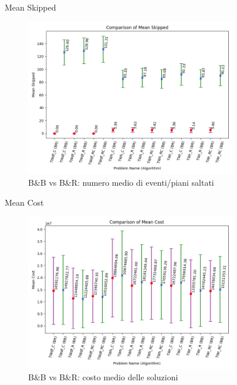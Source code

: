 \documentclass[10pt]{beamer}
\begin{document}
    \begin{frame}{Mean Skipped}
        \begin{figure}[h!]
            \centering
            \includegraphics[width=0.82\textwidth]{Images/mean_skipped.png}
            \caption{B\&B vs B\&R: numero medio di eventi/piani saltati}
            \label{fig:mean_skipped}
        \end{figure}
    \end{frame}

    \begin{frame}{Mean Cost}
        \begin{figure}[h!]
            \centering
            \includegraphics[width=0.82\textwidth]{Images/mean_cost.png}
            \caption{B\&B vs B\&R: costo medio delle soluzioni}
            \label{fig:Mean_cost}
        \end{figure}
    \end{frame}
\end{document}
